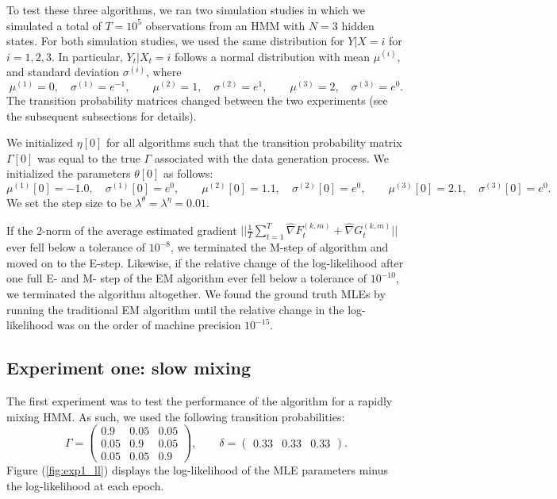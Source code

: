 To test these three algorithms, we ran two simulation studies in which we simulated a total of $T = 10^{5}$ observations from an HMM with $N = 3$ hidden states. For both simulation studies, we used the same distribution for $Y | X = i$ for $i = 1,2,3$. In particular, $Y_t | X_t = i$ follows a normal distribution with mean $\mu^{(i)}$, and standard deviation $\sigma^{(i)}$, where
%
\begin{equation*}
    \mu^{(1)} = 0, \quad \sigma^{(1)} = e^{-1}, \qquad
    \mu^{(2)} = 1, \quad \sigma^{(2)} = e^{1}, \qquad
    \mu^{(3)} = 2, \quad \sigma^{(3)} = e^{0}.
\end{equation*}
%
The transition probability matrices changed between the two experiments (see the subsequent subsections for details).

We initialized $\eta[0]$ for all algorithms such that the transition probability matrix $\Gamma[0]$ was equal to the true $\Gamma$ associated with the data generation process. We initialized the parameters $\theta[0]$ as follows:
%
\begin{equation*}
    \mu^{(1)}[0] = -1.0, \quad \sigma^{(1)}[0] = e^{0}, \qquad
    \mu^{(2)}[0] = 1.1, \quad \sigma^{(2)}[0] = e^{0}, \qquad
    \mu^{(3)}[0] = 2.1, \quad \sigma^{(3)}[0] = e^{0}.
\end{equation*}
%
We set the step size to be $\lambda^\theta = \lambda^\eta = 0.01$. 

If the 2-norm of the average estimated gradient $||\frac{1}{T}\sum_{t=1}^T \widehat \nabla F^{(k,m)}_t + \widehat \nabla G^{(k,m)}_t||$ ever fell below a tolerance of $10^{-8}$, we terminated the M-step of algorithm and moved on to the E-step. Likewise, if the relative change of the log-likelihood after one full E- and M- step of the EM algorithm ever fell below a tolerance of $10^{-10}$, we terminated the algorithm altogether. We found the ground truth MLEs by running the traditional EM algorithm until the relative change in the log-likelihood was on the order of machine precision $10^{-15}$.

\subsection{Experiment one: slow mixing}

The first experiment was to test the performance of the algorithm for a rapidly mixing HMM. As such, we used the following transition probabilities:
%
\begin{equation*}
    \Gamma = 
    \begin{pmatrix} 
        0.9 & 0.05 & 0.05 \\
        0.05 & 0.9 & 0.05 \\
        0.05 & 0.05 & 0.9
    \end{pmatrix},
    \qquad
    \delta = \begin{pmatrix} 0.33 & 0.33 & 0.33 \end{pmatrix}.
\end{equation*}
%
Figure (\ref{fig:exp1_ll}) displays the log-likelihood of the MLE parameters minus the log-likelihood at each epoch.

